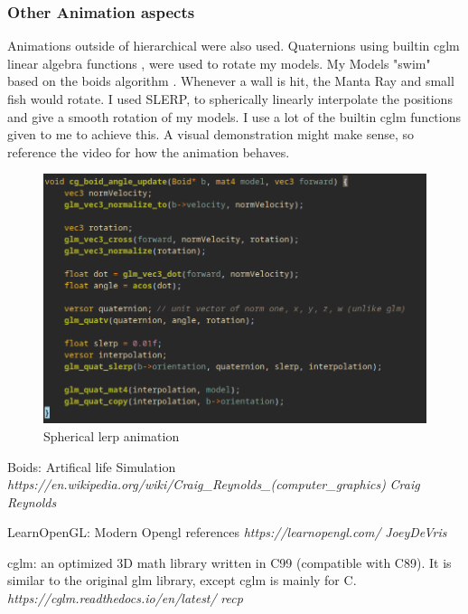 \documentclass[a4paper, 10pt]{article}
\begin{document}
\subsubsection{Other Animation aspects}
Animations outside of hierarchical were also used. Quaternions using builtin cglm linear algebra functions
\cite{cglm}, were used to rotate my models. My Models "swim" based on the boids algorithm \cite{boids}. 
Whenever a wall is hit, the Manta Ray and small fish would rotate. I used SLERP, to spherically linearly 
interpolate the positions and give a smooth rotation of my models. I use a lot of the builtin cglm functions 
given to me to achieve this. A visual demonstration might make sense, so reference the video for how the animation
behaves.

\begin{figure}[h]
    \centering
    \includegraphics[scale=0.8]{images/boids-lerp}
    \caption{Spherical lerp animation}
    \label{fig:mantaray-animation}
\end{figure}

\newpage

\begin{thebibliography}{9}
Boids: Artifical life Simulation
\textit{https://en.wikipedia.org/wiki/Craig\_Reynolds\_(computer\_graphics)}
\textit{Craig Reynolds}

LearnOpenGL: Modern Opengl references
\textit{https://learnopengl.com/}
\textit{JoeyDeVris}

cglm: an optimized 3D math library written in C99 (compatible with C89). 
It is similar to the original glm library, except cglm is mainly for C.
\textit{https://cglm.readthedocs.io/en/latest/}
\textit{recp}
\end{thebibliography}
\end{document}
